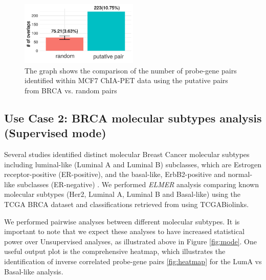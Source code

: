 \begin{figure}
\centering
\includegraphics[width=0.5\textwidth]{images/mcf7.pdf}
\caption[MCF7 ChIA-PET validation]{\label{fig:chiapet} The graph shows the comparison of the number of probe-gene pairs identified within MCF7 ChIA-PET data using the putative pairs from BRCA vs. random pairs}
\end{figure}

\subsection{Use Case 2: BRCA molecular subtypes analysis (Supervised mode)} 


Several studies identified distinct molecular Breast Cancer molecular subtypes including luminal-like (Luminal A and Luminal B) subclasses, which are Estrogen receptor-positive (ER-positive), and the basal-like, ErbB2-positive and normal-like subclasses (ER-negative) \cite{perou2000molecular,yersal2014biological,sorlie2001gene}. We performed \textit{ELMER} analysis comparing known molecular subtypes (Her2, Luminal A, Luminal B and Basal-like) using the TCGA BRCA dataset and classifications retrieved from \cite{ciriello2015comprehensive} using TCGABiolinks.

We performed pairwise analyses between different molecular subtypes. It is important to note that we expect these analyses to have increased statistical power over Unsupervised analyses, as illustrated above in Figure \ref{fig:mode}. One useful output plot is the comprehensive heatmap, 
which illustrates the identification of inverse correlated probe-gene pairs \ref{fig:heatmap} for the LumA vs Basal-like analysis.  

